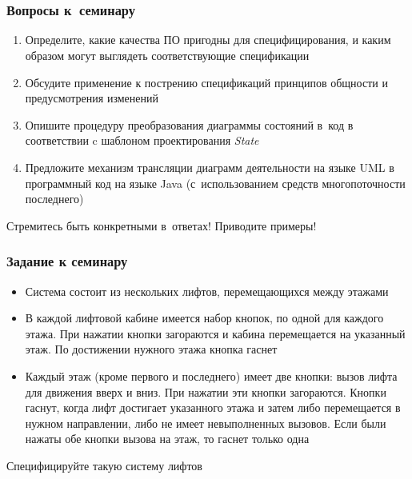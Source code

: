 \documentclass{softengineering-lectures}
\begin{document}
\section{}

\begin{frame} \frametitle{Вопросы к~семинару}
  \small
  \begin{enumerate}
  \item Определите, какие качества ПО пригодны для специфицирования, и каким
    образом могут выглядеть соответствующие спецификации
  \item Обсудите применение к пострению спецификаций принципов общности и
    предусмотрения изменений
  \item Опишите процедуру преобразования диаграммы состояний в~код в
    соответствии c шаблоном проектирования \emph{State}
  \item Предложите механизм трансляции диаграмм деятельности на языке UML в
    программный код на языке Java (с~использованием средств многопоточности последнего)
  \end{enumerate}
  \alert{Стремитесь быть конкретными в~ответах! Приводите примеры!}
\end{frame}

\begin{frame} \frametitle{Задание к семинару}
  \begin{itemize}
  \item Система состоит из нескольких лифтов, перемещающихся между этажами
  \item В каждой лифтовой кабине имеется набор кнопок, по одной для каждого
    этажа. При нажатии кнопки загораются и кабина перемещается на указанный
    этаж. По достижении нужного этажа кнопка гаснет
  \item Каждый этаж (кроме первого и последнего) имеет две кнопки: вызов лифта
    для движения вверх и вниз. При нажатии эти кнопки загораются. Кнопки гаснут,
    когда лифт достигает указанного этажа и затем либо перемещается в нужном
    направлении, либо не имеет невыполненных вызовов. Если были нажаты обе
    кнопки вызова на этаж, то гаснет только одна
  \end{itemize}
  Специфицируйте такую систему лифтов
\end{frame}
\end{document}
